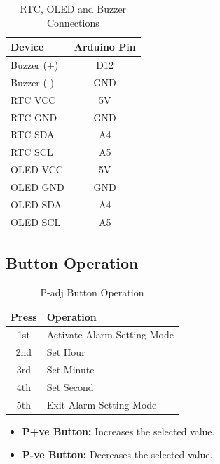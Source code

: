 \begin{table}[H]
\centering
\caption{RTC, OLED and Buzzer Connections}
\label{tab:alarm_connections}

\begin{tabular}{|l|c|}
\hline
\textbf{Device} & \textbf{Arduino Pin} \\
\hline
Buzzer (+) & D12 \\
Buzzer (-) & GND \\
RTC VCC & 5V \\
RTC GND & GND \\
RTC SDA & A4 \\
RTC SCL & A5 \\
OLED VCC & 5V \\
OLED GND & GND \\
OLED SDA & A4 \\
OLED SCL & A5 \\
\hline
\end{tabular}

\end{table}


\subsection{Button Operation}

\begin{table}[H]
\centering
\caption{P-adj Button Operation}
\label{tab:alarm_operation}

\begin{tabular}{|c|p{8cm}|}
\hline
\textbf{Press} & \textbf{Operation} \\
\hline
1st & Activate Alarm Setting Mode \\
2nd & Set Hour \\
3rd & Set Minute \\
4th & Set Second \\
5th & Exit Alarm Setting Mode \\
\hline
\end{tabular}

\end{table}

\begin{itemize}
\item \textbf{P+ve Button:} Increases the selected value.
\item \textbf{P-ve Button:} Decreases the selected value.
\end{itemize}

